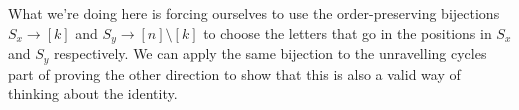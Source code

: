 What we're doing here is forcing ourselves to use the order-preserving bijections $S_{x} \to [k]$ and $S_{y} \to [n] \setminus [k]$ to choose the letters that go in the positions in $S_{x}$ and $S_{y}$ respectively. We can apply the same bijection to the unravelling cycles part of proving the other direction to show that this is also a valid way of thinking about the identity.
